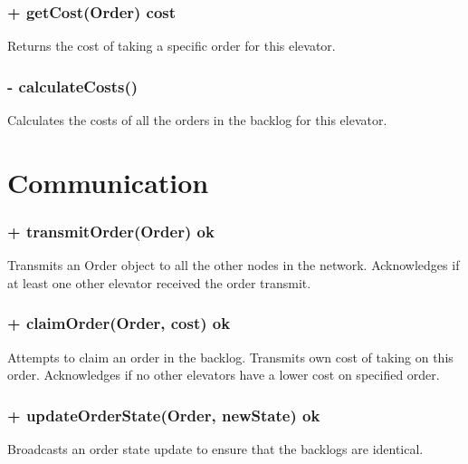 \documentclass[11pt,a4paper]{article}
\begin{document}
\subsubsection*{+ getCost(Order) cost}
Returns the cost of taking a specific order for this elevator.
\subsubsection*{- calculateCosts()}
Calculates the costs of all the orders in the backlog for this elevator.
\section*{Communication}
\subsubsection*{+ transmitOrder(Order) ok}
Transmits an Order object to all the other nodes in the network. Acknowledges if at least one other elevator received the order transmit.
\subsubsection*{+ claimOrder(Order, cost) ok}
Attempts to claim an order in the backlog. Transmits own cost of taking on this order. Acknowledges if no other elevators have a lower cost on specified order.
\subsubsection*{+ updateOrderState(Order, newState) ok}
Broadcasts an order state update to ensure that the backlogs are identical.
\end{document}
